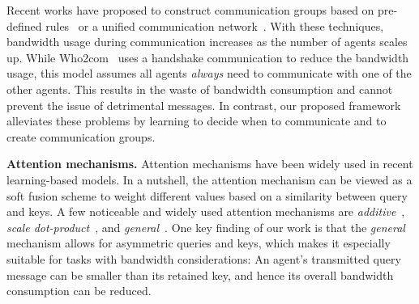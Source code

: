
Recent works have proposed to construct communication groups based on pre-defined rules~\cite{jiang2018learning,jiang2018graph} or a unified communication network~\cite{singh2018learning,sukhbaatar2016learning,hoshen2017vain,peng2017multiagent,singh2018learning,das2019tarmac}. 
With these techniques, bandwidth usage during communication increases as the number of agents scales up. While Who2com~\cite{liu2020who2com} uses a handshake communication to reduce the bandwidth usage, this model assumes all agents \textit{always} need to communicate with one of the other agents. 
This results in the waste of bandwidth consumption and cannot prevent the issue of detrimental messages. 
In contrast, our proposed framework alleviates these problems by learning to decide when to communicate and to create communication groups.



\textbf{Attention mechanisms.} 
Attention mechanisms have been widely used in recent learning-based models.
In a nutshell, the attention mechanism can be viewed as a soft fusion scheme to weight different values based on a similarity between query and keys. 
A few noticeable and widely used attention mechanisms are \textit{additive}~\cite{bahdanau2014neural}, \textit{scale dot-product}~\cite{vaswani2017attention}, and \textit{general}~\cite{luong2015effective}.
One key finding of our work is that the \textit{general} mechanism allows for asymmetric queries and keys, which makes it especially suitable for tasks with bandwidth considerations: An agent's transmitted query message can be smaller than its retained key, and hence its overall bandwidth consumption can be reduced.

